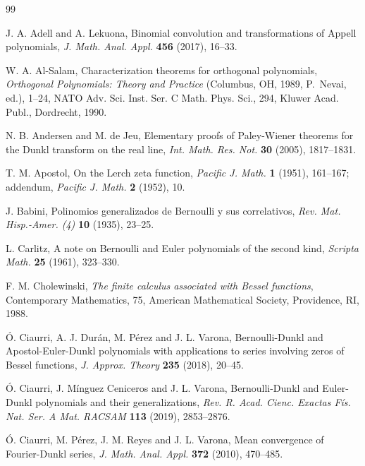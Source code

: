 \documentclass[11pt]{article}
\theoremstyle{plain}
\theoremstyle{remark}
\numberwithin{equation}{section} %
\begin{document}
\begin{thebibliography}{99}

J. A. Adell and A. Lekuona,
Binomial convolution and transformations of Appell polynomials,
\textit{J. Math. Anal. Appl.}
\textbf{456} (2017), 16--33.

W. A. Al-Salam,
Characterization theorems for orthogonal polynomials,
\textit{Orthogonal Polynomials: Theory and Practice}
(Columbus, OH, 1989, P.~Nevai, ed.), 1--24,
NATO Adv. Sci. Inst. Ser. C Math. Phys. Sci., 294,
Kluwer Acad. Publ., Dordrecht, 1990.

N. B. Andersen and M. de Jeu,
{Elementary proofs of Paley-Wiener theorems
for the Dunkl transform on the real line,}
\textit{Int. Math. Res. Not.}
\textbf{30} (2005), 1817--1831.

T. M. Apostol,
On the Lerch zeta function,
\textit{Pacific J. Math.} \textbf{1} (1951), 161--167;
addendum, \textit{Pacific J. Math.} \textbf{2} (1952), 10.

{J. Babini},
Polinomios generalizados de Bernoulli y sus correlativos,
\textit{Rev. Mat. Hisp.-Amer. (4)}
\textbf{10} (1935), 23--25.

{L. Carlitz},
A note on Bernoulli and Euler polynomials of the second kind,
\textit{Scripta Math.}
\textbf{25} (1961), 323--330.

F. M. Cholewinski, 
\textit{The finite calculus associated with Bessel functions}, 
Contemporary Mathematics, 75, American Mathematical Society, Providence, RI, 1988.

\'O. Ciaurri, A. J. Dur\'an, M. P\'erez and J. L. Varona,
Bernoulli-Dunkl and Apostol-Euler-Dunkl polynomials with applications to series involving
zeros of Bessel functions,
\textit{J. Approx. Theory}
\textbf{235} (2018), 20--45.

\'O. Ciaurri, J. M\'inguez Ceniceros and J. L. Varona,
{Bernoulli-Dunkl and Euler-Dunkl polynomials and their generalizations},
\textit{Rev. R. Acad. Cienc. Exactas F\'is. Nat. Ser. A Mat. RACSAM} 
\textbf{113} (2019), 2853--2876.

\'O. Ciaurri, M. P\'erez, J. M. Reyes and J. L. Varona,
Mean convergence of Fourier-Dunkl series,
\textit{J. Math. Anal. Appl.}
\textbf{372} (2010), 470--485.


\end{thebibliography}
\end{document}

